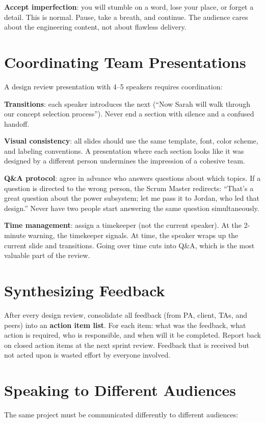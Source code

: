 \textbf{Accept imperfection}: you will stumble on a word, lose your place, or forget a detail. This is normal. Pause, take a breath, and continue. The audience cares about the engineering content, not about flawless delivery.

\section{Coordinating Team Presentations}
A design review presentation with 4--5 speakers requires coordination:

\textbf{Transitions}: each speaker introduces the next (``Now Sarah will walk through our concept selection process''). Never end a section with silence and a confused handoff.

\textbf{Visual consistency}: all slides should use the same template, font, color scheme, and labeling conventions. A presentation where each section looks like it was designed by a different person undermines the impression of a cohesive team.

\textbf{Q\&A protocol}: agree in advance who answers questions about which topics. If a question is directed to the wrong person, the Scrum Master redirects: ``That's a great question about the power subsystem; let me pass it to Jordan, who led that design.'' Never have two people start answering the same question simultaneously.

\textbf{Time management}: assign a timekeeper (not the current speaker). At the 2-minute warning, the timekeeper signals. At time, the speaker wraps up the current slide and transitions. Going over time cuts into Q\&A, which is the most valuable part of the review.

\section{Synthesizing Feedback}
After every design review, consolidate all feedback (from PA, client, TAs, and peers) into an \textbf{action item list}. For each item: what was the feedback, what action is required, who is responsible, and when will it be completed. Report back on closed action items at the next sprint review. Feedback that is received but not acted upon is wasted effort by everyone involved.


\section{Speaking to Different Audiences}
The same project must be communicated differently to different audiences:

